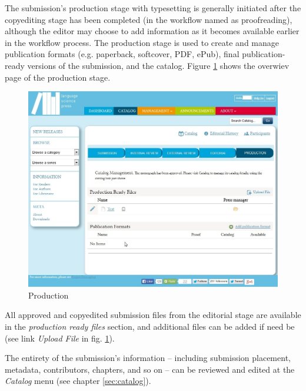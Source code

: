 The submission's production stage with typesetting is generally initiated after the copyediting stage has been completed (in the workflow named as proofreading), although the editor may choose to add information as it becomes available earlier in the workflow process. The production stage is used to create and manage publication formats (e.g. paperback, softcover, PDF, ePub), final publication-ready versions of the submission, and the catalog. 
Figure \ref{fig:production} shows the overwiev page of the production stage.

\begin{figure}[h] \centering
\includegraphics[width=1\textwidth]{./img/production.jpg} \caption{Production}
\label{fig:production}
\end{figure}


All approved and copyedited submission files from the editorial stage are available in the \textit{production ready files} section, and additional files can be added if need be (see link \textit{Upload File} in fig. \ref{fig:production}).

The entirety of the submission's information -- including submission placement, metadata, contributors, chapters, and so on -- can be reviewed and edited at the \textit{Catalog} menu (see chapter \ref{sec:catalog}).

